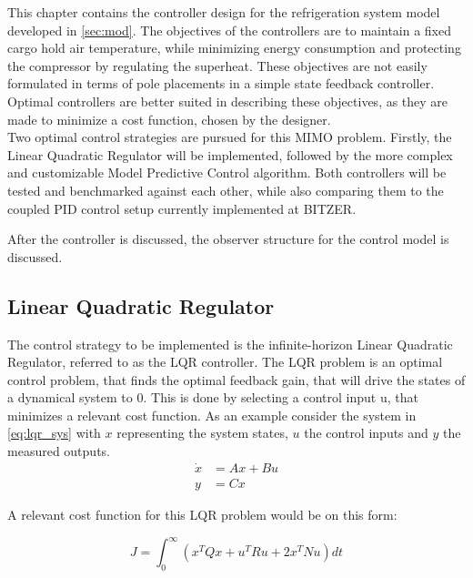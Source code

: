 This chapter contains the controller design for the refrigeration system model developed in \cref{sec:mod}. The objectives of the controllers are to maintain a fixed cargo hold air temperature, while minimizing energy consumption and protecting the compressor by regulating the superheat. These objectives are not easily formulated in terms of pole placements in a simple state feedback controller. Optimal controllers are better suited in describing these objectives, as they are made to minimize a cost function, chosen by the designer. \\

Two optimal control strategies are pursued for this MIMO problem. Firstly, the Linear Quadratic Regulator will be implemented, followed by the more complex and customizable Model Predictive Control algorithm. Both controllers will be tested and benchmarked against each other, while also comparing them to the coupled PID control setup currently implemented at BITZER.

After the controller is discussed, the observer structure for the control model is discussed.



\subsection{Linear Quadratic Regulator} \label{sec:linear-quadratic-regulator}
The control strategy to be implemented is the infinite-horizon Linear Quadratic Regulator, referred to as the LQR controller. The LQR problem is an optimal control problem, that finds the optimal feedback gain, that will drive the states of a dynamical system to 0. This is done by selecting a control input u, that minimizes a relevant cost function. As an example consider the system in \cref{eq:lqr_sys} with $x$ representing the system states, $u$ the control inputs and $y$ the measured outputs.\\

\begin{equation} \label{eq:lqr_sys}
	\begin{split}
		\dot{x} 	& = Ax + Bu \\
		y 	& = Cx
	\end{split}
\end{equation}

A relevant cost function for this LQR problem would be on this form:

\begin{equation} \label{eq:lqr_cost_fcn}
	J = \int_0^{\infty} \left(x^TQx + u^TRu + 2x^TNu\right)dt
\end{equation}

